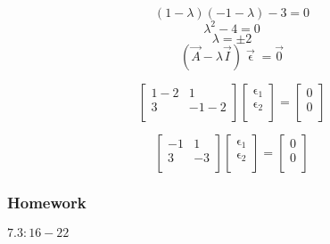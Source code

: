 \documentclass[12pt, letterpaper, twoside]{article}
\begin{document}
		$$(1-\lambda)(-1-\lambda)-3 = 0$$
		$$\lambda^2 - 4 = 0$$
		$$\lambda = \pm 2$$
		$$(\vec{A} - \lambda \vec{I}) \vec{\upvarepsilon} = \vec{0}$$
		
		$$
		\begin{bmatrix}
		  1-2 & 1\\
		  3 & -1-2\\
		\end{bmatrix}
		\begin{bmatrix}
		  \upvarepsilon_1\\
		  \upvarepsilon_2\\
		\end{bmatrix}		
		=		
		\begin{bmatrix}
		  0\\
		  0\\
		\end{bmatrix}
		$$
		
		$$
		\begin{bmatrix}
		  -1 & 1\\
		  3 & -3\\
		\end{bmatrix}
		\begin{bmatrix}
		  \upvarepsilon_1\\
		  \upvarepsilon_2\\
		\end{bmatrix}		
		=		
		\begin{bmatrix}
		  0\\
		  0\\
		\end{bmatrix}
		$$	
		
	\subsubsection*{Homework}
	  $7.3 : 16-22$
\end{document}
